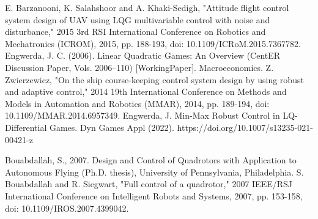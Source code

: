 \documentclass[conference]{IEEEtran}
\begin{document}
\begin{thebibliography}{00}
 E. Barzanooni, K. Salahshoor and A. Khaki-Sedigh, "Attitude flight control system design of UAV using LQG multivariable control with noise and disturbance," 2015 3rd RSI International Conference on Robotics and Mechatronics (ICROM), 2015, pp. 188-193, doi: 10.1109/ICRoM.2015.7367782.
 Engwerda, J. C. (2006). Linear Quadratic Games: An Overview (CentER Discussion Paper, Vols. 2006–110) [WorkingPaper]. Macroeconomics.
 Z. Zwierzewicz, "On the ship course-keeping control system design by using robust and adaptive control," 2014 19th International Conference on Methods and Models in Automation and Robotics (MMAR), 2014, pp. 189-194, doi: 10.1109/MMAR.2014.6957349.
 Engwerda, J. Min-Max Robust Control in LQ-Differential Games. Dyn Games Appl (2022). https://doi.org/10.1007/s13235-021-00421-z


 Bouabdallah, S., 2007. Design and Control of Quadrotors with Application to
Autonomous Flying (Ph.D. thesis), University of Pennsylvania, Philadelphia.
 S. Bouabdallah and R. Siegwart, "Full control of a quadrotor," 2007 IEEE/RSJ International Conference on Intelligent Robots and Systems, 2007, pp. 153-158, doi: 10.1109/IROS.2007.4399042.


\end{thebibliography}
\vspace{12pt}
\end{document}
